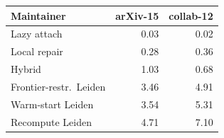 \begin{tabular}{l rr}
\toprule
Maintainer & arXiv-15 & collab-12\\
\midrule
Lazy attach & 0.03 & 0.02 \\
Local repair & 0.28 & 0.36 \\
Hybrid & 1.03 & 0.68 \\
Frontier-restr.\ Leiden & 3.46 & 4.91 \\
Warm-start Leiden & 3.54 & 5.31 \\
Recompute Leiden & 4.71 & 7.10 \\
\bottomrule
\end{tabular}
